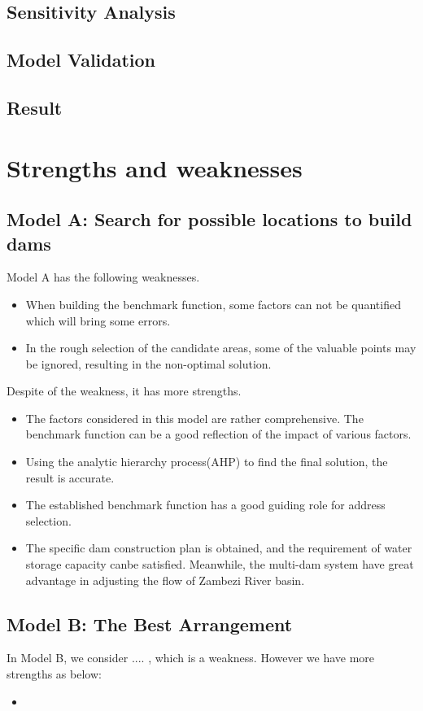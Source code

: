 \documentclass{mcmthesis}
\begin{document}
\subsection{Sensitivity Analysis}

\subsection{Model Validation}

\subsection{Result}

\section{Strengths and weaknesses}
\subsection{Model A: Search for possible locations to build dams}
Model A has the following weaknesses.
\begin{itemize}
\item When building the benchmark function, some factors can not be quantified which will bring some errors.
\item In the rough selection of the candidate areas, some of the valuable points may be ignored, resulting in the non-optimal solution.
\end{itemize}
Despite of the weakness, it has more strengths.
\begin{itemize}
  \item The factors considered in this model are rather comprehensive. The benchmark function can be a good reflection of the impact of various factors.
  \item Using the analytic hierarchy process(AHP) to find the final solution, the result is accurate.
  \item The established benchmark function has a good guiding role for address selection.
  \item The specific dam construction plan is obtained, and the requirement of water storage capacity canbe satisfied. Meanwhile, the multi-dam system have great advantage in adjusting the flow of Zambezi River basin.
\end{itemize}

\subsection{Model B: The Best Arrangement}
In Model B, we consider .... , which is a weakness. However we have more strengths as below:
\begin{itemize}
  \item 
\end{itemize}
\end{document}
